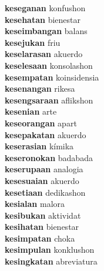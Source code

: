 \textbf{keseganan } konfushon \\
\textbf{kesehatan } bienestar \\
\textbf{keseimbangan } balans \\
\textbf{kesejukan } friu \\
\textbf{keselarasan } akuerdo \\
\textbf{keselesaan } konsolashon \\
\textbf{kesempatan } koinsidensia \\
\textbf{kesenangan } rikesa \\
\textbf{kesengsaraan } aflikshon \\
\textbf{kesenian } arte \\
\textbf{keseorangan } apart \\
\textbf{kesepakatan } akuerdo \\
\textbf{keserasian } kímika \\
\textbf{keseronokan } badabada \\
\textbf{keserupaan } analogia \\
\textbf{kesesuaian } akuerdo \\
\textbf{kesetiaan } dedikashon \\
\textbf{kesialan } malora \\
\textbf{kesibukan } aktividat \\
\textbf{kesihatan } bienestar \\
\textbf{kesimpatan } choka \\
\textbf{kesimpulan } konklushon \\
\textbf{kesingkatan } abreviatura \\
